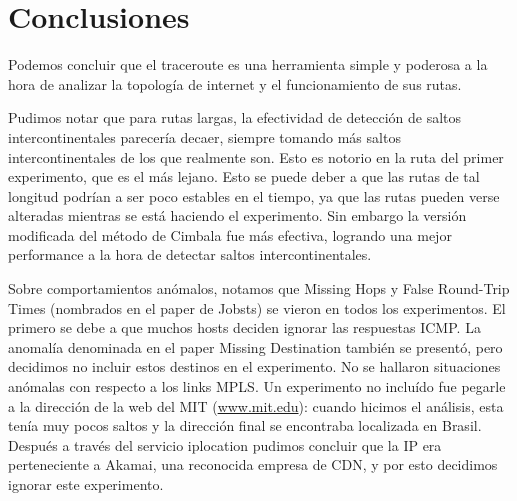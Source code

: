 \section{Conclusiones}

Podemos concluir que el traceroute es una herramienta simple y poderosa a la hora de analizar la topología de internet y el funcionamiento de sus rutas. 

Pudimos notar que para rutas largas, la efectividad de detección de saltos intercontinentales parecería decaer, siempre tomando más saltos intercontinentales de los que realmente son. Esto es notorio en la ruta del primer experimento, que es el más lejano. Esto se puede deber a que las rutas de tal longitud podrían a ser poco estables en el tiempo, ya que las rutas pueden verse alteradas mientras se está haciendo el experimento. Sin embargo la versión modificada del método de Cimbala fue más efectiva, logrando una mejor performance a la hora de detectar saltos intercontinentales.

Sobre comportamientos anómalos, notamos que Missing Hops y False Round-Trip Times (nombrados en el paper de Jobsts) se vieron en todos los experimentos. El primero se debe a que muchos hosts deciden ignorar las respuestas ICMP. La anomalía denominada en el paper Missing Destination también se presentó, pero decidimos no incluir estos destinos en el experimento. No se hallaron situaciones anómalas con respecto a los links MPLS. Un experimento no incluído fue pegarle a la dirección de la web del MIT (\url{www.mit.edu}): cuando hicimos el análisis, esta tenía muy pocos saltos y la dirección final se encontraba localizada en Brasil. Después a través del servicio iplocation pudimos concluir que la IP era perteneciente a Akamai, una reconocida empresa de CDN, y por esto decidimos ignorar este experimento.
